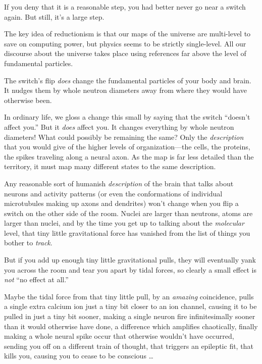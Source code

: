 {
 If you deny that it is a reasonable step, you had better never go
near a switch again. But still, it's a large step.}

{
 The key idea of reductionism is that our maps of the universe are
multi-level to save on computing power, but physics seems to be
strictly single-level. All our discourse about the universe takes place
using references far above the level of fundamental particles.}

{
 The switch's flip \textit{does} change the
fundamental particles of your body and brain. It nudges them by whole
neutron diameters away from where they would have otherwise been.}

{
 In ordinary life, we gloss a change this small by saying that the
switch ``doesn't affect
you.'' But it \textit{does} affect you. It changes
everything by whole neutron diameters! What could possibly be remaining
the same? Only the \textit{description} that you would give of the
higher levels of organization---the cells, the proteins, the spikes
traveling along a neural axon. As the map is far less detailed than the
territory, it must map many different states to the same description.}

{
 Any reasonable sort of humanish \textit{description} of the brain
that talks about neurons and activity patterns (or even the
conformations of individual microtubules making up axons and dendrites)
won't change when you flip a switch on the other side
of the room. Nuclei are larger than neutrons, atoms are larger than
nuclei, and by the time you get up to talking about the
\textit{molecular} level, that tiny little gravitational force has
vanished from the list of things you bother to \textit{track}.}

{
 But if you add up enough tiny little gravitational pulls, they
will eventually yank you across the room and tear you apart by tidal
forces, so clearly a small effect is \textit{not} ``no
effect at all.''}

{
 Maybe the tidal force from that tiny little pull, by an
\textit{amazing} coincidence, pulls a single extra calcium ion just a
tiny bit closer to an ion channel, causing it to be pulled in just a
tiny bit sooner, making a single neuron fire infinitesimally sooner
than it would otherwise have done, a difference which amplifies
chaotically, finally making a whole neural spike occur that otherwise
wouldn't have occurred, sending you off on a different
train of thought, that triggers an epileptic fit, that kills you,
causing you to cease to be conscious \ldots}

